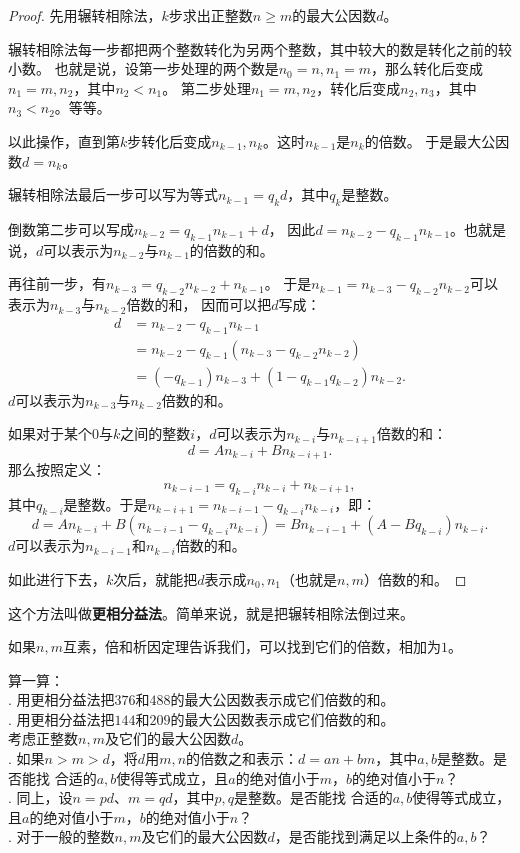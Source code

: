 \documentclass[12pt,UTF8]{ctexbook}
\begin{document}
\begin{proof}
    先用辗转相除法，$k$步求出正整数$n\geqslant m$的最大公因数$d$。

    辗转相除法每一步都把两个整数转化为另两个整数，其中较大的数是转化之前的较小数。
    也就是说，设第一步处理的两个数是$n_0=n,n_1=m$，那么转化后变成$n_1=m,n_2$，其中$n_2 < n_1$。
    第二步处理$n_1=m,n_2$，转化后变成$n_2,n_3$，其中$n_3 < n_2$。等等。
    
    以此操作，直到第$k$步转化后变成$n_{k-1}, n_k$。这时$n_{k-1}$是$n_k$的倍数。
    于是最大公因数$d = n_k$。

    辗转相除法最后一步可以写为等式$n_{k-1} = q_{k}d $，其中$q_{k}$是整数。

    倒数第二步可以写成$n_{k-2} = q_{k-1}n_{k-1} + d$，
    因此$d = n_{k-2} -q_{k-1}n_{k-1}$。也就是说，$d$可以表示为$n_{k-2}$与$n_{k-1}$的倍数的和。

    再往前一步，有$n_{k-3} = q_{k-2}n_{k-2} + n_{k-1}$。
    于是$n_{k-1} = n_{k-3} - q_{k-2}n_{k-2}$可以表示为$n_{k-3}$与$n_{k-2}$倍数的和，
    因而可以把$d$写成：
    \begin{align*}
        d &= n_{k-2} - q_{k-1}n_{k-1}  \\
          &= n_{k-2} - q_{k-1}(n_{k-3} - q_{k-2}n_{k-2})  \\ 
          &= (- q_{k-1})n_{k-3} + (1 - q_{k-1}q_{k-2})n_{k-2}. 
    \end{align*}
    $d$可以表示为$n_{k-3}$与$n_{k-2}$倍数的和。

    如果对于某个$0$与$k$之间的整数$i$，$d$可以表示为$n_{k-i}$与$n_{k-i+1}$倍数的和：
    $$ d = An_{k-i} + Bn_{k-i+1}. $$
    那么按照定义：
    $$n_{k-i-1} = q_{k-i}n_{k-i} + n_{k-i+1},$$
    其中$q_{k-i}$是整数。于是$n_{k-i+1} = n_{k-i-1} - q_{k-i}n_{k-i}$，即：
    $$ d = An_{k-i} + B(n_{k-i-1} - q_{k-i}n_{k-i}) = Bn_{k-i-1} + (A - Bq_{k-i})n_{k-i}.$$
    $d$可以表示为$n_{k-i-1}$和$n_{k-i}$倍数的和。

    如此进行下去，$k$次后，就能把$d$表示成$n_0,n_1$（也就是$n,m$）倍数的和。
\end{proof}

这个方法叫做\textbf{更相分益法}。简单来说，就是把辗转相除法倒过来。

如果$n,m$互素，倍和析因定理告诉我们，可以找到它们的倍数，相加为$1$。


\begin{xt}\label{xt:5-1-1}
    算一算：\\
    . 用更相分益法把$376$和$488$的最大公因数表示成它们倍数的和。\\
    . 用更相分益法把$144$和$209$的最大公因数表示成它们倍数的和。\\
    考虑正整数$n,m$及它们的最大公因数$d$。\\
    . 如果$n > m > d$，将$d$用$m,n$的倍数之和表示：$d = an + bm$，其中$a, b$是整数。是否能找
    合适的$a, b$使得等式成立，且$a$的绝对值小于$m$，$b$的绝对值小于$n$？\\
    . 同上，设$n = pd$、$m = qd$，其中$p, q$是整数。是否能找
    合适的$a, b$使得等式成立，且$a$的绝对值小于$m$，$b$的绝对值小于$n$？\\
    . 对于一般的整数$n,m$及它们的最大公因数$d$，是否能找到满足以上条件的$a, b$？
\end{xt}
\end{document}
